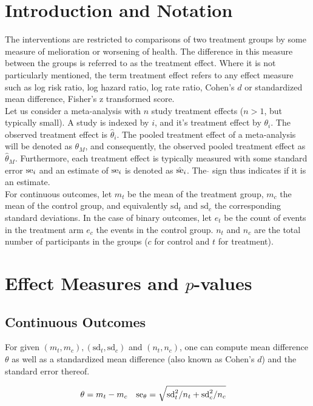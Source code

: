 \documentclass[11pt,a4paper,twoside]{book}\usepackage[]{graphicx}\usepackage[]{color}
\begin{document}
\section{Introduction and Notation}
The interventions are restricted to comparisons of two treatment groups by some measure of melioration or worsening of health. The difference in this measure between the groups is referred to as the treatment effect. Where it is not particularly mentioned, the term treatment effect refers to any effect measure such as log risk ratio, log hazard ratio, log rate ratio, Cohen's $d$ or standardized mean difference, Fisher's z transformed score.\\
Let us consider a meta-analysis with $n$ study treatment effects ($n > 1$, but typically small). A study is indexed by $i$, and it's treatment effect by  $\theta_i$. The observed treatment effect is $\hat{\theta}_i$. The pooled treatment effect of a meta-analysis will be denoted as $\theta_M$, and consequently, the observed pooled treatment effect as $\hat{\theta}_M$. Furthermore, each treatment effect is typically measured with some standard error $\operatorname{se}_i$ and an estimate of $\operatorname{se}_i$ is denoted as $\hat{\operatorname{se}}_i$. The $\hat{}$ sign thus indicates if it is an estimate.\\
For continuous outcomes, let $m_t$ be the mean of the treatment group, $m_c$ the mean of the control group, and equivalently $\textrm{sd}_t$ and $\textrm{sd}_c$ the corresponding standard deviations. 
In the case of binary outcomes, let $e_t$ be the count of events in the treatment arm $e_c$ the events in the control group. $n_t$ and $n_c$ are the total number of participants in the groups ($c$ for control and $t$ for treatment).%

\section{Effect Measures and $p$\hspace{0.4mm}-values}
\subsection{Continuous Outcomes}
For given $(m_t, m_c), (\textrm{sd}_t, \textrm{sd}_c)$ and $(n_t, n_c)$, one can compute mean difference $\theta$ as well as a standardized mean difference (also known as Cohen's $d$) and the standard error thereof.

\begin{align}
\theta &= m_t - m_c & \operatorname{se}_\theta &= \sqrt{\textrm{sd}_t^2/n_t + \textrm{sd}_c^2/n_c}
\end{align}
\end{document}
